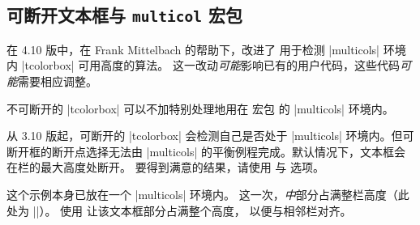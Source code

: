 \clearpage
\subsection{可断开文本框与 \texttt{multicol} 宏包}\label{subsec:multicol}
\begin{marker}
在 4.10 版中，在 Frank Mittelbach 的帮助下，改进了
用于检测 |multicols| 环境内 |tcolorbox| 可用高度的算法。
这一改动\emph{可能}影响已有的用户代码，这些代码\emph{可能}需要相应调整。
\end{marker}

\begin{multicols}{2}
\begin{tcolorbox}[enhanced jigsaw,size=small,breakable,colback=yellow!10!white,
  colframe=red!50!white,break at=3cm,height fixed for=all]
不可断开的 |tcolorbox| 可以不加特别处理地用在
 宏包 \cite{mittelbach:multicol} 的 |multicols| 环境内。

从 3.10 版起，可断开的 |tcolorbox| 会检测自己是否处于
|multicols| 环境内。但可断开框的断开点选择无法由
|multicols| 的平衡例程完成。默认情况下，文本框会在栏的最大高度处断开。
要得到满意的结果，请使用  与  选项。
\end{tcolorbox}
\end{multicols}

\enlargethispage{\baselineskip}
\begin{dispListing}
\footnotesize
\begin{multicols}{2}
  \lipsum[1]
  \begin{tcolorbox}[enhanced jigsaw,breakable,size=title,
    colback=red!5!white,colframe=red!75!black,fonttitle=\bfseries,
    title=My breakable box,pad at break=1mm, break at=-\baselineskip/0pt ]
  \lipsum[2-4]
  \end{tcolorbox}
  \lipsum[4]
\end{multicols}
\end{dispListing}
{\tcbusetemp}

\clearpage

\begin{multicols}{2}
\small
这个示例本身已放在一个 |multicols| 环境内。
这一次，\emph{中}部分占满整栏高度（此处为 |\textheight|）。
使用  让该文本框部分占满整个高度，
以便与相邻栏对齐。
\begin{dispListing}
\lipsum[1]
\begin{tcolorbox}[enhanced jigsaw,
  breakable,
  size=title,
  colback=red!5!white,
  colframe=red!75!black,
  fonttitle=\bfseries,
  title=My breakable box,
  pad at break=2mm,
  break at=-\baselineskip/0pt,
  height fixed for=middle ]
\lipsum[2-7]
\end{tcolorbox}
\lipsum[8]
\end{dispListing}
{\tcbusetemp}
\end{multicols}



